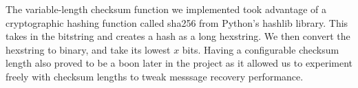 \documentclass[titlepage]{article}
\begin{document}
The variable-length checksum function we implemented took advantage of a cryptographic hashing function called sha256 from Python's hashlib library. This takes in the bitstring and creates a hash as a long hexstring. We then convert the hexstring to binary, and take its lowest $x$ bits. Having a configurable checksum length also proved to be a boon later in the project as it allowed us to experiment freely with checksum lengths to tweak messsage recovery performance.

\begin{figure}
\makebox[\textwidth][c]{
}
\end{figure}
\end{document}

